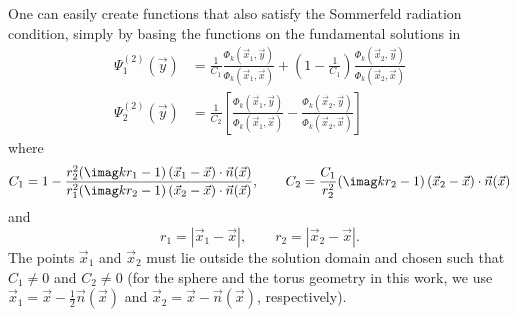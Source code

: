 One can easily create functions that also satisfy the Sommerfeld radiation condition, simply by basing the functions on the fundamental solutions in 
\begin{equation}\label{Eq3:psi_12_2}
\begin{aligned}
	\Psi_1^{(2)}(\vec{y}) &= \frac{1}{C_1}\frac{\Phi_k(\vec{x}_1,\vec{y})}{\Phi_k(\vec{x}_1,\vec{x})}+\left(1-\frac{1}{C_1}\right)\frac{\Phi_k(\vec{x}_2,\vec{y})}{\Phi_k(\vec{x}_2,\vec{x})}\\
	\Psi_2^{(2)}(\vec{y}) &= \frac{1}{C_2}\left[\frac{\Phi_k(\vec{x}_1,\vec{y})}{\Phi_k(\vec{x}_1,\vec{x})}-\frac{\Phi_k(\vec{x}_2,\vec{y})}{\Phi_k(\vec{x}_2,\vec{x})}\right]
\end{aligned}
\end{equation}
where
\begin{equation*}
	C_1 = 1- \frac{r_2^2(\imag k r_1-1)\left(\vec{x}_1-\vec{x}\right)\cdot \vec{n}(\vec{x})}{r_1^2(\imag k r_2-1)\left(\vec{x}_2-\vec{x}\right)\cdot \vec{n}(\vec{x})},\qquad C_2 = \frac{C_1}{r_2^2} (\imag k r_2-1)\left(\vec{x}_2-\vec{x}\right)\cdot \vec{n}(\vec{x})
\end{equation*}
and
\begin{equation*}
	r_1 = |\vec{x}_1-\vec{x}|,\qquad r_2 = |\vec{x}_2-\vec{x}|.
\end{equation*}
The points $\vec{x}_1$ and $\vec{x}_2$ must lie outside the solution domain and chosen such that $C_1\neq 0$ and $C_2\neq 0$ (for the sphere and the torus geometry in this work, we use $\vec{x}_1=\vec{x} - \frac{1}{2}\vec{n}(\vec{x})$ and $\vec{x}_2=\vec{x} - \vec{n}(\vec{x})$, respectively).

